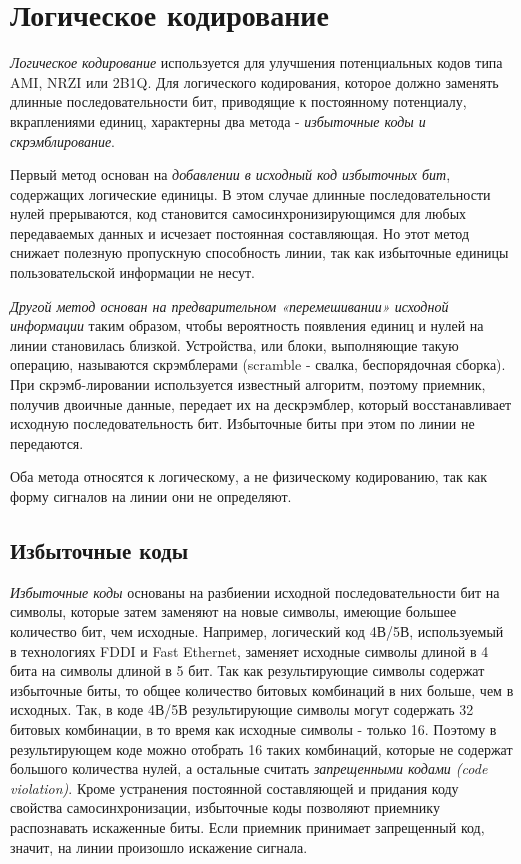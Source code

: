 \section{Логическое кодирование}

\emph{Логическое кодирование} используется для улучшения потенциальных кодов типа AMI, NRZI или 2B1Q.
Для логического кодирования, которое должно заменять длинные последовательности бит, приводящие к постоянному потенциалу, вкраплениями единиц, характерны два метода - \emph{избыточные коды и скрэмблирование}.

Первый метод основан на \emph{добавлении в исходный код избыточных бит}, содержащих логические единицы.
В этом случае длинные последовательности нулей прерываются, код становится самосинхронизирующимся для любых передаваемых данных и исчезает постоянная составляющая.
Но этот метод снижает полезную пропускную способность линии, так как избыточные единицы пользовательской информации не несут.

\emph{Другой метод основан на предварительном «перемешивании» исходной информации} таким образом, чтобы вероятность появления единиц и нулей на линии становилась близкой.
Устройства, или блоки, выполняющие такую операцию, называются скрэмблерами (scramble - свалка, беспорядочная сборка).
При скрэмб-лировании используется известный алгоритм, поэтому приемник, получив двоичные данные, передает их на дескрэмблер, который восстанавливает исходную последовательность бит.
Избыточные биты при этом по линии не передаются.

Оба метода относятся к логическому, а не физическому кодированию, так как форму сигналов на линии они не определяют.

\subsection{Избыточные коды}

\emph{Избыточные коды} основаны на разбиении исходной последовательности бит на символы, которые затем заменяют на новые символы, имеющие большее количество бит, чем исходные.
Например, логический код 4В/5В, используемый в технологиях FDDI и Fast Ethernet, заменяет исходные символы длиной в 4 бита на символы длиной в 5 бит.
Так как результирующие символы содержат избыточные биты, то общее количество битовых комбинаций в них больше, чем в исходных.
Так, в коде 4В/5В результирующие символы могут содержать 32 битовых комбинации, в то время как исходные символы - только 16.
Поэтому в результирующем коде можно отобрать 16 таких комбинаций, которые не содержат большого количества нулей, а остальные считать \emph{запрещенными кодами (code violation)}.
Кроме устранения постоянной составляющей и придания коду свойства самосинхронизации, избыточные коды позволяют приемнику распознавать искаженные биты.
Если приемник принимает запрещенный код, значит, на линии произошло искажение сигнала.

